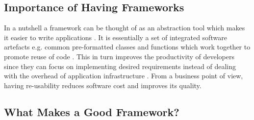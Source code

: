 \subsection{Importance of Having Frameworks}
\label{subsec:importance-of-having-frameworks}

In a nutshell a framework can be thought of as an abstraction tool which makes it easier to write applications \cite{1stwebdesigner}. It is essentially a set of integrated software artefacts e.g. common pre-formatted classes and functions which work together to promote reuse of code \cite{framework-report-vamderbilt}. This in turn improves the productivity of developers since they can focus on implementing desired requirements instead of dealing with the overhead of application infrastructure \cite{cimetrix}. From a business point of view, having re-usability reduces software cost and improves its quality.

\subsection{What Makes a Good Framework?}
\label{subsec:what-makes-a-good-framework}

